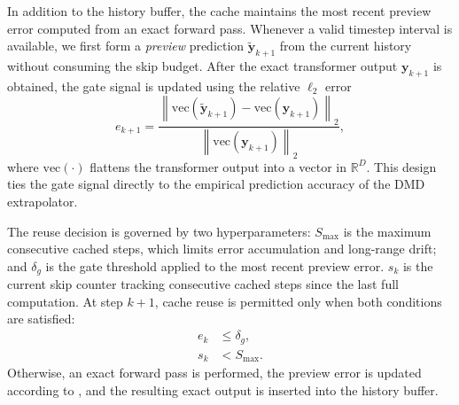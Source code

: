 In addition to the history buffer,
the cache maintains the most recent preview error
computed from an exact forward pass.
Whenever a valid timestep interval is available,
we first form a \emph{preview} prediction
$\tilde{\mathbf{y}}_{k+1}$
from the current history
without consuming the skip budget.
After the exact transformer output $\mathbf{y}_{k+1}$ is obtained,
the gate signal is updated using the relative $\ell_2$ error
\begin{equation}
e_{k+1}
=
\frac{
    \left\|
        \mathrm{vec}\!\left(\tilde{\mathbf{y}}_{k+1}\right)
        -
        \mathrm{vec}\!\left(\mathbf{y}_{k+1}\right)
    \right\|_2
}{
    \left\|
        \mathrm{vec}\!\left(\mathbf{y}_{k+1}\right)
    \right\|_2
},
\label{eq:method:gate-error}
\end{equation}
where $\mathrm{vec}(\cdot)$ flattens the transformer output
into a vector in $\mathbb{R}^D$.
This design ties the gate signal directly
to the empirical prediction accuracy
of the DMD extrapolator.

The reuse decision is governed by two hyperparameters:
$S_{\max}$ is the maximum consecutive cached steps,
which limits error accumulation and long-range drift; and
$\delta_g$ is the gate threshold applied to the most recent preview error.
$s_k$ is the current skip counter tracking consecutive cached steps
since the last full computation.
At step \(k+1\),
cache reuse is permitted only when both conditions are satisfied:
\begin{equation}
\begin{aligned}
e_k &\le \delta_g, \\
s_k &< S_{\max}.
\end{aligned}
\label{eq:method:gating}
\end{equation}
Otherwise, an exact forward pass is performed,
the preview error is updated according to ,
and the resulting exact output is inserted into the history buffer.
